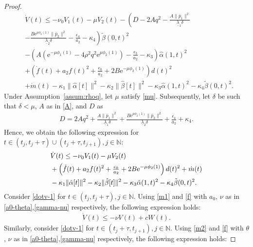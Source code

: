 \documentclass[letterpaper, 10 pt, conference]{ieeeconf}
\begin{document}
\begin{proof}
    \begin{align*}
        &\dot V(t) \leq-\nu_0V_1(t) - \mu V_2(t)-\left(D - 2Aq^2 - \tfrac{A\|\bar p_1\|^2}{\underline{\lambda}_1\delta}\right.\\
        &\left.- \tfrac{B\mathrm{e}^{\mu\phi_2(1)}\|\bar p_2\|^2}{\underline{\lambda}_2\delta}- \tfrac{\epsilon_4}{a_2} - \kappa_4\right)\tilde \beta(0,t)^2\\
        &-\left(A\left(\mathrm{e}^{-\mu\phi_1(1)}-4\rho^2q^2\mathrm{e}^{\mu\phi_2(1)}\right)-\tfrac{\epsilon_3}{a_2}- \kappa_3\right)\hat \alpha(1,t)^2\\
        &+\left(\dot f(t) + a_2f(t)^2+ \tfrac{\epsilon_0}{a_2} + 2B\mathrm{e}^{-\mu\phi_2(1)}\right)d(t)^2\\
        & + \dot m(t)- \kappa_1\|\hat \alpha[t]\|^2 - \kappa_2\|\hat \beta[t]\|^2 - \kappa_3\hat \alpha(1,t)^2 - \kappa_4\tilde \beta(0,t)^2. 
    \end{align*}
    Under Assumption~\ref{assum:rhoq}, let $\mu$ satisfy \eqref{mu}. Subsequently, let $\delta$ be such that $\delta<\mu$, $A$ as in \eqref{A}, and $D$ as
    \begin{align*}
        D = 2Aq^2 + \tfrac{A\|\bar p_1\|^2}{\underline{\lambda}_1\delta} + \tfrac{B\mathrm{e}^{\mu\phi_2(1)}\|\bar p_2\|^2}{\underline{\lambda}_2\delta} + \tfrac{\epsilon_4}{a_2} + \kappa_4.
    \end{align*}
    Hence, we obtain the following expression for $t\in(t_j,t_j+\tau)\cup(t_j+\tau,t_{j+1}),j\in\mathbb{N}$:
    \begin{align}
        &\dot V(t) \leq-\nu_0V_1(t) - \mu V_2(t)\notag\\
        &+\left(\dot f(t) + a_2f(t)^2+ \tfrac{\epsilon_0}{a_2} + 2B\mathrm{e}^{-\mu\phi_2(1)}\right)d(t)^2+ \dot m(t)\notag\\
        & - \kappa_1\|\hat \alpha[t]\|^2 - \kappa_2\|\hat \beta[t]\|^2 - \kappa_3\hat \alpha(1,t)^2 - \kappa_4\tilde \beta(0,t)^2.\label{dotv-1}
    \end{align}
    Consider \eqref{dotv-1} for $t\in(t_j,t_j+\tau),j\in\mathbb{N}$. Using \eqref{m1} and \eqref{f} with $a_0$, $\nu$ as in \eqref{a0-theta},\eqref{gamma-nu} respectively, the following expression holds:
    \begin{align}
        \dot V(t)\leq -\nu V(t) + cW(t).\label{dotv-2}
    \end{align}
    Similarly, consider \eqref{dotv-1} for $t\in(t_j+\tau,t_{j+1}),j\in\mathbb{N}$. Using \eqref{m2} and \eqref{f} with $\theta$, $\nu$ as in \eqref{a0-theta},\eqref{gamma-nu} respectively, the following expression holds:

\end{proof}
\end{document}
